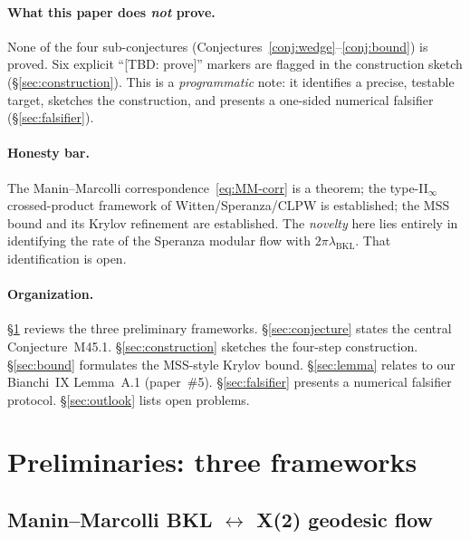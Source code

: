 \documentclass[12pt,a4paper]{article}
\begin{document}
\paragraph{What this paper does \emph{not} prove.}
None of the four sub-conjectures
(Conjectures~\ref{conj:wedge}--\ref{conj:bound}) is proved.
Six explicit ``[TBD: prove]'' markers are flagged in the
construction sketch (\S\ref{sec:construction}).
This is a \emph{programmatic} note: it identifies a precise, testable
target, sketches the construction, and presents a one-sided numerical
falsifier (\S\ref{sec:falsifier}).

\paragraph{Honesty bar.}
The Manin--Marcolli correspondence~\eqref{eq:MM-corr} is a theorem;
the type-II$_\infty$ crossed-product framework of
Witten/Speranza/CLPW is established; the MSS bound and its
Krylov refinement are established.
The \emph{novelty} here lies entirely in identifying the rate of the
Speranza modular flow with $2\pi\lambda_{\mathrm{BKL}}$.
That identification is open.

\paragraph{Organization.}
\S\ref{sec:prelim} reviews the three preliminary frameworks.
\S\ref{sec:conjecture} states the central Conjecture~M45.1.
\S\ref{sec:construction} sketches the four-step construction.
\S\ref{sec:bound} formulates the MSS-style Krylov bound.
\S\ref{sec:lemma} relates to our Bianchi~IX Lemma~A.1 (paper~\#5).
\S\ref{sec:falsifier} presents a numerical falsifier protocol.
\S\ref{sec:outlook} lists open problems.

\section{Preliminaries: three frameworks}\label{sec:prelim}

\subsection{Manin--Marcolli BKL $\leftrightarrow$ X(2) geodesic flow}\label{ssec:MM}
\end{document}
